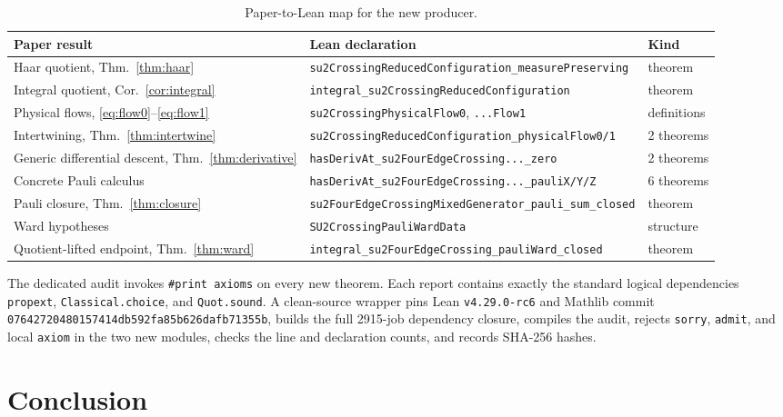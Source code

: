 \documentclass[11pt]{article}
\theoremstyle{definition}
\begin{document}
\begin{table}[ht]
\centering\scriptsize
\caption{Paper-to-Lean map for the new producer.}
\label{tab:lean}
\begin{tabularx}{\textwidth}{@{}p{}X p{}@{}}
\toprule
Paper result & Lean declaration & Kind \\
\midrule
Haar quotient, Thm.~\ref{thm:haar}
 & \texttt{su2CrossingReducedConfiguration\_measurePreserving} & theorem \\
Integral quotient, Cor.~\ref{cor:integral}
 & \texttt{integral\_su2CrossingReducedConfiguration} & theorem \\
Physical flows, \eqref{eq:flow0}--\eqref{eq:flow1}
 & \texttt{su2CrossingPhysicalFlow0}, \texttt{...Flow1} & definitions \\
Intertwining, Thm.~\ref{thm:intertwine}
 & \texttt{su2CrossingReducedConfiguration\_physicalFlow0/1} & 2 theorems \\
Generic differential descent, Thm.~\ref{thm:derivative}
 & \texttt{hasDerivAt\_su2FourEdgeCrossing...\_zero} & 2 theorems \\
Concrete Pauli calculus
 & \texttt{hasDerivAt\_su2FourEdgeCrossing...\_pauliX/Y/Z} & 6 theorems \\
Pauli closure, Thm.~\ref{thm:closure}
 & \texttt{su2FourEdgeCrossingMixedGenerator\_pauli\_sum\_closed} & theorem \\
Ward hypotheses
 & \texttt{SU2CrossingPauliWardData} & structure \\
Quotient-lifted endpoint, Thm.~\ref{thm:ward}
 & \texttt{integral\_su2FourEdgeCrossing\_pauliWard\_closed} & theorem \\
\bottomrule
\end{tabularx}
\end{table}

The dedicated audit invokes \texttt{\#print axioms} on every new theorem.
Each report contains exactly the standard logical dependencies
\texttt{propext}, \texttt{Classical.choice}, and \texttt{Quot.sound}.  A
clean-source wrapper pins Lean \texttt{v4.29.0-rc6} and Mathlib commit
\texttt{07642720480157414db592fa85b626d\allowbreak{}afb71355b}, builds the
full 2915-job
dependency closure, compiles the audit, rejects \texttt{sorry},
\texttt{admit}, and local \texttt{axiom} in the two new modules, checks the
line and declaration counts, and records SHA-256 hashes.

\FloatBarrier
\section{Conclusion}
\end{document}
